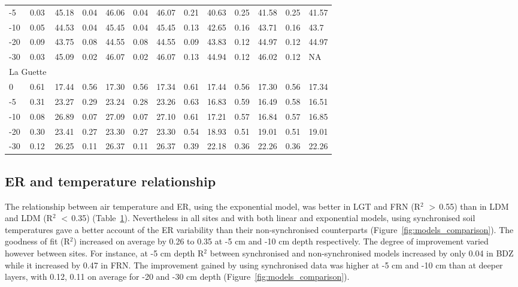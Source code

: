 \begin{table}
\begin{tabular}{lllllllllllll}
-5 & 0.03 & 45.18 & 0.04 & 46.06 & 0.04 & 46.07 & 0.21 & 40.63 & 0.25 & 41.58 & 0.25 & 41.57\\
-10 & 0.05 & 44.53 & 0.04 & 45.45 & 0.04 & 45.45 & 0.13 & 42.65 & 0.16 & 43.71 & 0.16 & 43.7\\
-20 & 0.09 & 43.75 & 0.08 & 44.55 & 0.08 & 44.55 & 0.09 & 43.83 & 0.12 & 44.97 & 0.12 & 44.97\\
-30 & 0.03 & 45.09 & 0.02 & 46.07 & 0.02 & 46.07 & 0.13 & 44.94 & 0.12 & 46.02 & 0.12 & NA\\
\multicolumn{2}{l}{La Guette} & & & & & & & & & & & \\[-.5ex]
0 & 0.61 & 17.44 & 0.56 & 17.30 & 0.56 & 17.34 & 0.61 & 17.44 & 0.56 & 17.30 & 0.56 & 17.34\\
-5 & 0.31 & 23.27 & 0.29 & 23.24 & 0.28 & 23.26 & 0.63 & 16.83 & 0.59 & 16.49 & 0.58 & 16.51\\
-10 & 0.08 & 26.89 & 0.07 & 27.09 & 0.07 & 27.10 & 0.61 & 17.21 & 0.57 & 16.84 & 0.57 & 16.85\\
-20 & 0.30 & 23.41 & 0.27 & 23.30 & 0.27 & 23.30 & 0.54 & 18.93 & 0.51 & 19.01 & 0.51 & 19.01\\
-30 & 0.12 & 26.25 & 0.11 & 26.37 & 0.11 & 26.37 & 0.39 & 22.18 & 0.36 & 22.26 & 0.36 & 22.26\\
\hline
\end{tabular} 
\hspace*{-1cm}
\label{table:mod_R2_RMSE}
\end{table}

\subsection{ER and temperature relationship}

The relationship between air temperature and ER, using the exponential model, was better in LGT and FRN (R$^{2}$ $>$\,0.55) than in LDM and LDM (R$^{2}$ $<$\,0.35) (Table~\ref{table:mod_R2_RMSE}).
Nevertheless in all sites and with both linear and exponential models, using synchronised  soil temperatures gave a better account of the ER variability than their non-synchronised counterparts (Figure~\ref{fig:models_comparison}).
The goodness of fit (R$^2$) increased on average by 0.26 to 0.35 at -5 cm and -10 cm depth respectively.
The degree of improvement varied however between sites.
For instance, at -5 cm depth R$^2$ between synchronised and non-synchronised models increased by only 0.04 in BDZ while it increased by 0.47 in FRN.
The improvement gained by using synchronised data was higher at -5 cm and -10 cm than at deeper layers, with 0.12, 0.11 on average for -20 and -30 cm depth (Figure~\ref{fig:models_comparison}).

